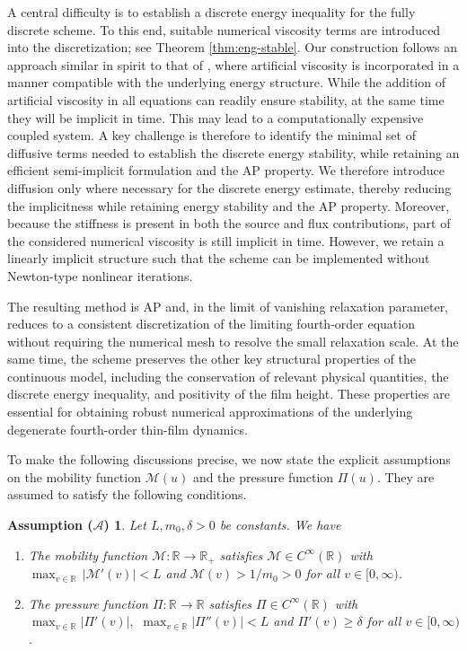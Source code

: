 \documentclass[11pt]{article}
\numberwithin{equation}{section}
\newtheorem{counter example}[theorem]{Counter Example}
\numberwithin{equation}{section}
\numberwithin{equation}{section}
\newtheorem*{assumption}{Assumption ($\mathcal{A}$)}
\begin{document}
A central difficulty is to establish a discrete energy inequality for the fully discrete scheme. To this end, suitable numerical viscosity terms are introduced into the discretization; see Theorem \ref{thm:eng-stable}.  Our construction follows an approach similar in spirit to that of \cite{berthon2023artificial}, where artificial viscosity is incorporated in a manner compatible with the underlying energy structure. While the addition of artificial viscosity in all equations can readily ensure stability, at the same time they will be implicit in time. This may lead to a computationally expensive coupled system. A key challenge is therefore to identify the minimal set of diffusive terms needed to establish the discrete energy stability, while retaining an efficient semi-implicit formulation and the AP property. We therefore introduce diffusion only where necessary for the discrete energy estimate, thereby reducing the implicitness while retaining energy stability and the AP property. Moreover, because the stiffness is present in both the source and flux contributions, part of the considered numerical viscosity is still implicit in time. However, we retain a linearly implicit structure such that the scheme can be implemented without Newton-type nonlinear iterations.

The resulting method is AP and, in the limit of vanishing relaxation parameter, reduces to a consistent discretization of the limiting fourth-order equation without requiring the numerical mesh to resolve the small relaxation scale. At the same time, the scheme preserves the other key structural properties of the continuous model, including the conservation of relevant physical quantities, the discrete energy inequality, and positivity of the film height. These properties are essential for obtaining robust numerical approximations of the underlying degenerate fourth-order thin-film dynamics.

To make the following discussions precise, we now state the explicit assumptions on the mobility function $\mathcal{M}(u)$ and the pressure function $\Pi(u)$. They are assumed to satisfy the following conditions.
\begin{assumption}\label{assumption.A}
\leavevmode
Let $L, m_0, \delta>0$ be constants. We have
\begin{enumerate}[label=($\mathcal{A}.\arabic*$),ref=$\mathcal{A}.\arabic*$]
  \item\label{A.1}The mobility function $\mathcal{M}:\mathbb{R}\to\mathbb{R}_+$ satisfies $\mathcal{M}\in C^\infty(\mathbb{R})$ with $\max_{v\in \mathbb{R}}\,\lvert \mathcal{M}'(v)\rvert < L$ and $\mathcal{M}(v)>1/m_0>0$ for all $v\in [0, \infty)$.
  \item\label{A.2} The pressure function $\Pi:\mathbb{R}\to\mathbb{R}$ satisfies $\Pi\in C^\infty(\mathbb{R})$ with $\max_{v\in \mathbb{R}}\lvert \Pi'(v)\rvert,\,\, \max_{v\in \mathbb{R}}\lvert \Pi''(v)\rvert  < L$ and $\Pi'(v)\geq \delta$ for all $v\in [0, \infty)$.
\end{enumerate}
\end{assumption}
\end{document}
